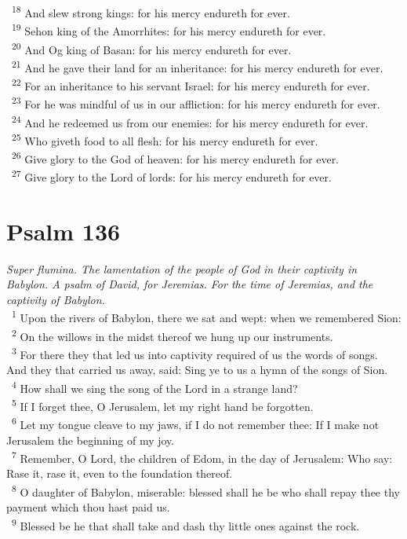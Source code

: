 \documentclass[a5paper,12pt]{article}
\begin{document}
\begin{multicols*}{2}
~\textsuperscript{18} And slew strong kings: for his mercy endureth for ever.\\
~\textsuperscript{19} Sehon king of the Amorrhites: for his mercy endureth for ever.\\
~\textsuperscript{20} And Og king of Basan: for his mercy endureth for ever.\\
~\textsuperscript{21} And he gave their land for an inheritance: for his mercy endureth for ever.\\
~\textsuperscript{22} For an inheritance to his servant Israel: for his mercy endureth for ever.\\
~\textsuperscript{23} For he was mindful of us in our affliction: for his mercy endureth for ever.\\
~\textsuperscript{24} And he redeemed us from our enemies: for his mercy endureth for ever.\\
~\textsuperscript{25} Who giveth food to all flesh: for his mercy endureth for ever.\\
~\textsuperscript{26} Give glory to the God of heaven: for his mercy endureth for ever.\\
~\textsuperscript{27} Give glory to the Lord of lords: for his mercy endureth for ever.\\

\section{Psalm 136}
\label{sec:orgbd7af1f}
\emph{Super flumina. The lamentation of the people of God in their captivity in Babylon. A psalm of David, for Jeremias. For the time of Jeremias, and the captivity of Babylon.}\\

~\textsuperscript{1} Upon the rivers of Babylon, there we sat and wept: when we remembered Sion:\\
~\textsuperscript{2} On the willows in the midst thereof we hung up our instruments.\\
~\textsuperscript{3} For there they that led us into captivity required of us the words of songs. And they that carried us away, said: Sing ye to us a hymn of the songs of Sion.\\
~\textsuperscript{4} How shall we sing the song of the Lord in a strange land?\\
~\textsuperscript{5} If I forget thee, O Jerusalem, let my right hand be forgotten.\\
~\textsuperscript{6} Let my tongue cleave to my jaws, if I do not remember thee: If I make not Jerusalem the beginning of my joy.\\
~\textsuperscript{7} Remember, O Lord, the children of Edom, in the day of Jerusalem: Who say: Rase it, rase it, even to the foundation thereof.\\
~\textsuperscript{8} O daughter of Babylon, miserable: blessed shall he be who shall repay thee thy payment which thou hast paid us.\\
~\textsuperscript{9} Blessed be he that shall take and dash thy little ones against the rock.\\


\end{multicols*}
\end{document}
